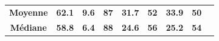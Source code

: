 \documentclass[french]{beamer}
\newcommand{\B}[1]{\textbf{#1}}	%
\def\s{\hphantom{0}}	%
\begin{document}
{\begin{frame}
\begin{center}
{\begin{tabular}{ccccccccc}
\B{Moyenne} &  \B{\s62.1} & \B{\s9.6} & \B{87} & \B{\s31.7} & \B{52} & \B{\s33.9} & \B{50} \\
\B{Médiane} &  \B{\s58.8} & \B{\s6.4} & \B{88} & \B{\s24.6} & \B{56} & \B{\s25.2} & \B{54} \\
\bottomrule    
\end{tabular}
}

\vspace*{25px}



\end{center}
\end{frame}}
\end{document}
